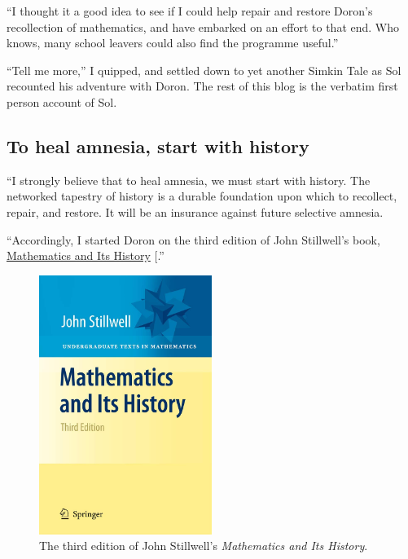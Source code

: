 \documentclass[
  a4paper,
]{article}
\begin{document}
``I thought it a good idea to see if I could help repair and restore
Doron's recollection of mathematics, and have embarked on an effort to
that end. Who knows, many school leavers could also find the programme
useful.''

``Tell me more,'' I quipped, and settled down to yet another Simkin Tale
as Sol recounted his adventure with Doron. The rest of this blog is the
verbatim first person account of Sol.

\subsection{To heal amnesia, start with
history}\label{to-heal-amnesia-start-with-history}

``I strongly believe that to heal amnesia, we must start with history.
The networked tapestry of history is a durable foundation upon which to
recollect, repair, and restore. It will be an insurance against future
selective amnesia.

``Accordingly, I started Doron on the third edition of John Stillwell's
book,
\href{https://www.amazon.in/Mathematics-Its-History-Undergraduate-Texts/dp/144196052X}{Mathematics
and Its History} {[}\citeproc{ref-stillwell2010}{1}{]}.''

\begin{figure}
\centering
\includegraphics[width=0.5\textwidth,height=\textheight]{images/stillwell-history-third.jpg}
\caption{The third edition of John Stillwell's \emph{Mathematics and Its
History}.}\label{fig:stillwell}
\end{figure}
\end{document}
